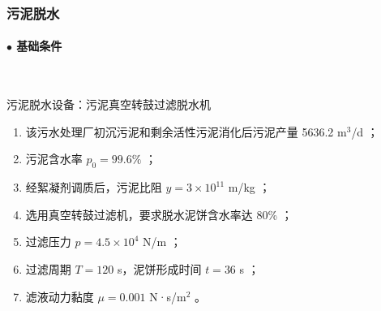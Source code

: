 






\subsubsection{污泥脱水}
\paragraph{$\bullet $ 基础条件}~{}\par
污泥脱水设备：污泥真空转鼓过滤脱水机
\begin{enumerate}
    \item 该污水处理厂初沉污泥和剩余活性污泥消化后污泥产量 5636.2 m$^3$/d ；
    \item 污泥含水率 $p_0=99.6\%$ ；
    \item 经絮凝剂调质后，污泥比阻 $y=3\times 10^{11}$ m/kg ；
    \item 选用真空转鼓过滤机，要求脱水泥饼含水率达 80\% ；
    \item 过滤压力 $p=4.5\times 10^4$ N/m ；
    \item 过滤周期 $T=120$ s，泥饼形成时间 $t=36$ s ；
    \item 滤液动力黏度 $\mu =0.001$ N·s/m$^2$ 。
\end{enumerate}


